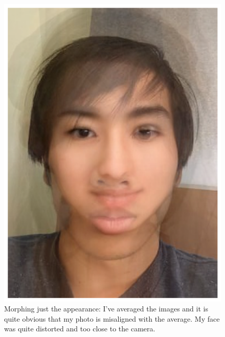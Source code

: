 \documentclass{article}
\begin{document}
\begin{figure}[!htb]
    \centering
    \includegraphics[scale=0.5]{im12.png}
    \caption{Morphing just the appearance: I've averaged the images and it is quite obvious that my photo is misaligned with the average. My face was quite distorted and too close to the camera.}
\end{figure}
\end{document}
